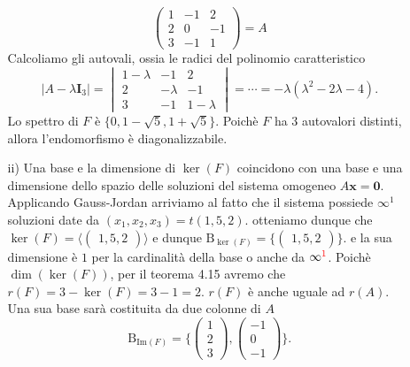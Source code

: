 \documentclass{article}
\theoremstyle{plain}
\theoremstyle{definition}
\theoremstyle{remark}
\begin{document}
\begin{enumerate}
\begin{enumerate}
\[\begin{pmatrix}
        1&-1&2\\
        2&0&-1\\
        3&-1&1
        \end{pmatrix}=A\]
        Calcoliamo gli autovali, ossia le radici del polinomio caratteristico
        \[|A-\lambda\mathbf{I}_3|=\begin{vmatrix}
        1-\lambda&-1&2\\
        2&-\lambda&-1\\
        3&-1&1-\lambda
        \end{vmatrix}=\cdots=-\lambda(\lambda^2-2\lambda-4).\]
        Lo spettro di $F$ è $\{0,1-\sqrt{5},1+\sqrt{5}\}$. Poichè $F$ ha $3$ autovalori distinti, allora l'endomorfismo è diagonalizzabile.
        \item[ii)] 
        Una base e la dimensione di $\ker(F)$ coincidono con una base e una dimensione dello spazio delle soluzioni del sistema omogeneo 
        $A\mathbf{x}=\mathbf{0}$. Applicando Gauss-Jordan arriviamo al fatto che il sistema possiede $\infty^1$ soluzioni date da $(x_1,x_2,x_3)=t(1,5,2)$.
        otteniamo dunque che $\ker(F)=\langle\begin{pmatrix}1,5,2\end{pmatrix}\rangle$ e dunque $\mathrm{B}_{\ker(F)}=\{\begin{pmatrix}1,5,2\end{pmatrix}\}$.
        e la sua dimensione è $1$ per la cardinalità della base o anche da $\infty^{\textcolor{red}{1}}$.
        Poichè $\dim(\ker(F))$, per il teorema 4.15 avremo che $r(F)=3-\ker(F)=3-1=2$. $r(F)$ è anche uguale ad $r(A)$. Una sua base sarà costituita da due colonne di $A$
        \[\mathrm{B}_{\mathrm{Im}(F)}=\{\begin{pmatrix}1\\2\\3\end{pmatrix},\begin{pmatrix}-1\\0\\-1\end{pmatrix}\}.\]


\end{enumerate}
\end{enumerate}
\end{document}

